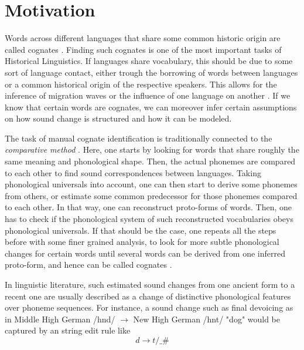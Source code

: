 \documentclass[6pt]{article}
\begin{document}
\section{Motivation}
\label{Motivation}
Words across different languages that share some common historic origin are called cognates \citep[p. 193]{trask1996historical}. Finding such cognates is one of the most important tasks of Historical Linguistics. If languages share vocabulary, this should be due to some sort of language contact, either trough the borrowing of words between languages or a common historical origin of the respective speakers. This allows for the inference of migration waves \citep{gray2009language,bouckaert2012mapping} or the influence of one language on another \citep{dellert2015uralic}. If we know that certain words are cognates, we can moreover infer certain assumptions on how sound change is structured and how it can be modeled.


The task of manual cognate identification is traditionally connected to the \textit{comparative method} \citep[p. 191ff]{trask1996historical}. Here, one starts by looking for words that share roughly the same meaning and phonological shape. Then, the actual phonemes are compared to each other to find sound correspondences between languages. Taking phonological universals into account, one can then start to derive some phonemes from others, or estimate some common predecessor for those phonemes compared to each other. In that way, one can reconstruct proto-forms of words. Then, one has to check if the phonological system of such reconstructed vocabularies obeys phonological universals. If that should be the case, one repeats all the steps before with some finer grained analysis, to look for more subtle phonological changes
 for certain words until several words can be derived from one inferred proto-form, and hence can be called cognates .  
 

In linguistic literature, such estimated sound changes from one ancient form to a recent one are usually described as a change of distinctive phonological features over phoneme sequences. For instance, a sound change such as final devoicing as in Middle High German /hnd/ $\rightarrow$ New High German /hnt/ "dog" would be captured by an string edit rule like
\begin{equation}
d \rightarrow t / \_ \#
\label{eq:final_devoicing_symbolic}
\end{equation}
\end{document}
